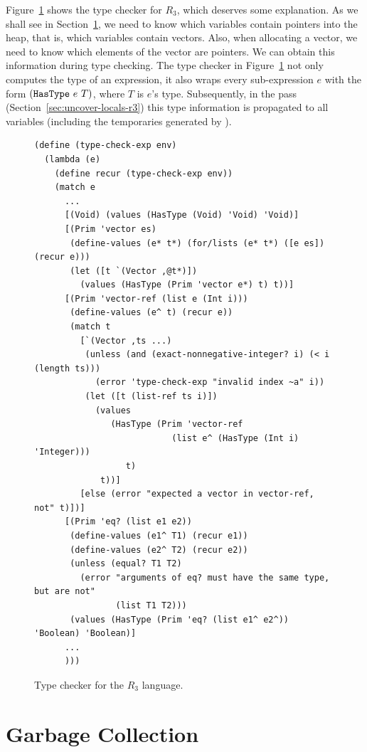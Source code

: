 \documentclass[11pt]{book}
\begin{document}
Figure~\ref{fig:typecheck-R3} shows the type checker for $R_3$, which
deserves some explanation. As we shall see in Section~\ref{sec:GC}, we
need to know which variables contain pointers into the heap, that is,
which variables contain vectors. Also, when allocating a vector, we
need to know which elements of the vector are pointers. We can obtain
this information during type checking. The type checker in
Figure~\ref{fig:typecheck-R3} not only computes the type of an
expression, it also wraps every sub-expression $e$ with the form
$(\texttt{HasType}~e~T)$, where $T$ is $e$'s type.
Subsequently, in the  pass
(Section~\ref{sec:uncover-locals-r3}) this type information is
propagated to all variables (including the temporaries generated by
).

\begin{figure}[hb]
\begin{lstlisting}
(define (type-check-exp env)
  (lambda (e)
    (define recur (type-check-exp env))
    (match e
      ...
      [(Void) (values (HasType (Void) 'Void) 'Void)]
      [(Prim 'vector es)
       (define-values (e* t*) (for/lists (e* t*) ([e es]) (recur e)))
       (let ([t `(Vector ,@t*)])
         (values (HasType (Prim 'vector e*) t) t))]
      [(Prim 'vector-ref (list e (Int i)))
       (define-values (e^ t) (recur e))
       (match t
         [`(Vector ,ts ...)
          (unless (and (exact-nonnegative-integer? i) (< i (length ts)))
            (error 'type-check-exp "invalid index ~a" i))
          (let ([t (list-ref ts i)])
            (values
               (HasType (Prim 'vector-ref
                           (list e^ (HasType (Int i) 'Integer)))
                  t)
             t))]
         [else (error "expected a vector in vector-ref, not" t)])]
      [(Prim 'eq? (list e1 e2))
       (define-values (e1^ T1) (recur e1))
       (define-values (e2^ T2) (recur e2))
       (unless (equal? T1 T2)
         (error "arguments of eq? must have the same type, but are not"
                (list T1 T2)))
       (values (HasType (Prim 'eq? (list e1^ e2^)) 'Boolean) 'Boolean)]
      ...
      )))
\end{lstlisting}
\caption{Type checker for the $R_3$ language.}
\label{fig:typecheck-R3}
\end{figure}


\section{Garbage Collection}
\label{sec:GC}
\end{document}
